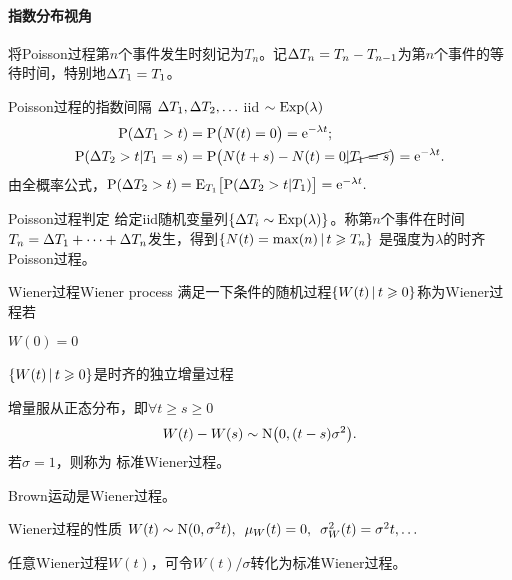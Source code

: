 \paragraph{指数分布视角}
将Poisson过程第$ n $个事件发生时刻记为$ T_n$。记$\Delta T_n=T_n-T_{n-1} $为第$ n $个事件的等待时间，特别地$\Delta T_1 = T_1$。
\begin{theorem}{Poisson过程的指数间隔}{}
	$\Delta T_1,\Delta T_2,\ldots$ iid $\sim\operatorname{Exp}(\lambda)$
	\begin{align*}
		\operatorname{P}(\Delta T_1>t)&=\operatorname{P}\bigl(N(t)=0\bigr)=\mathop{}\!\mathrm{e}^{-\lambda t};\\
		\operatorname{P}(\Delta T_2>t|T_1=s)&=\operatorname{P}\bigl(N(t+s)-N(t)=0\cancel{|T_1=s}\bigr)=\mathop{}\!\mathrm{e}^{-\lambda t}.
	\end{align*}
	由全概率公式，$\operatorname{P}(\Delta T_2>t)=\operatorname{E}_{T_1}\bigl[\operatorname{P}(\Delta T_2>t|T_1)\bigr]=\mathop{}\!\mathrm{e}^{-\lambda t}.$
\end{theorem}
\begin{theorem}{Poisson过程判定}{}
	给定iid随机变量列$\{\Delta T_i\sim\operatorname{Exp}(\lambda)\}$。称第$ n $个事件在时间$T_n =\Delta T_1 + \cdots +\Delta T_n $发生，得到$\left\{N(t)=\max(n)\,\middle\vert\,t\geqslant T_n\right\}$
	是强度为$\lambda$的时齐Poisson过程。
\end{theorem}
\begin{definition}{Wiener过程}{Wiener process}
	满足一下条件的随机过程$\left\{W(t)\,\middle\vert\,t\geqslant 0\right\}$称为Wiener过程若
	\begin{compactitem}
		\item $W(0)=0$
		\item $\left\{W(t)\,\middle\vert\,t\geqslant 0\right\}$是时齐的独立增量过程
		\item 增量服从正态分布，即$\forall t\geqslant s\geqslant 0$
		\[
			W(t)-W(s)\sim\operatorname{N}\bigl(0,(t-s)\sigma^2\bigr).
		\]
		若$\sigma=1$，则称为 标准Wiener过程。
	\end{compactitem}
\end{definition}
Brown运动是Wiener过程。
\begin{theorem}{Wiener过程的性质}{}
	$W(t)\sim\operatorname{N}(0,\sigma^2t),\enspace\mu_W(t)=0,\enspace\sigma^2_W(t)=\sigma^2t,\ldots$%
\end{theorem}
任意Wiener过程$W(t)$，可令$W(t)/\sigma$转化为标准Wiener过程。

